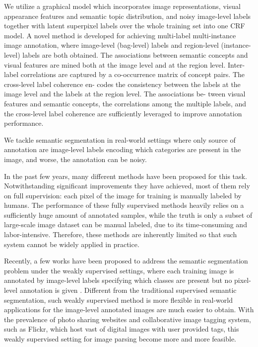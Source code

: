 \if

 We utilize a graphical model which incorporates image representations, visual appearance features and semantic topic distribution, and noisy image-level labels together with latent superpixel labels over the whole training set into one CRF model. A novel method is developed for achieving multi-label multi-instance image annotation, where image-level (bag-level) labels and region-level (instance-level) labels are both obtained. The associations between semantic concepts and visual features are mined both at the image level and at the region level. Inter-label correlations are captured by a co-occurrence matrix of concept pairs. The cross-level label coherence en- codes the consistency between the labels at the image level and the labels at the region level. The associations be- tween visual features and semantic concepts, the correlations among the multiple labels, and the cross-level label coherence are sufficiently leveraged to improve annotation performance.

We tackle semantic segmentation in real-world settings where only source of annotation are image-level labels encoding which categories are present in the image, and worse, the annotation can be noisy.

In the past few years, many different methods \cite{csurka2011efficient,gonfaus2010harmony,ladicky2009associative,nowozin2010parameter,shotton2008semantic,shotton2006textonboost,singh2013nonparametric,verbeek2007scene,yang2007multiple,yao2012describing} have been proposed for this task. Notwithstanding significant improvements they have achieved, most of them rely on full supervision: each pixel of the image for training is manually labeled by humans. The performance of these fully supervised methods heavily relies on a sufficiently huge amount of annotated samples, while the truth is only a subset of large-scale image dataset can be manual labeled, due to its time-consuming and labor-intensive. Therefore, these methods are inherently limited so that such system cannot be widely applied in practice.

Recently, a few works have been proposed to address the semantic segmentation problem under the weakly supervised settings, where each training image is annotated by image-level labels specifying which classes are present but no pixel-level annotation is given \cite{verbeek2007region,vezhnevets2010towards,vezhnevets2011weakly,vezhnevets2012weakly,xu2014tell,zhang2013sparse,zhang2013probabilistic}. Different from the traditional supervised semantic segmentation, such weakly supervised method is more flexible in real-world applications for the image-level annotated images are much easier to obtain. With the prevalence of photo sharing websites and collaborative image tagging system, such as Flickr, which host vast of digital images with user provided tags, this weakly supervised setting for image parsing become more and more feasible.

